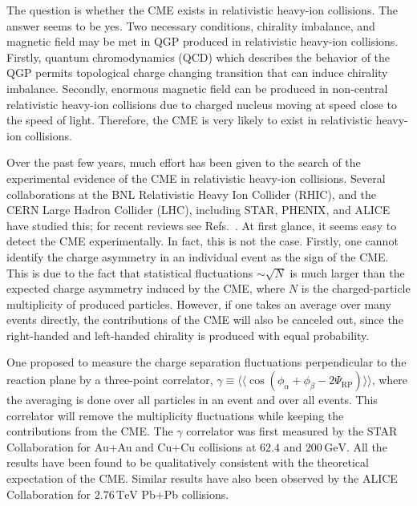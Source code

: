 \documentclass[preprint]{elsarticle}
\begin{document}
The question is whether the CME exists in relativistic heavy-ion collisions. The answer seems to be yes. Two necessary conditions, chirality imbalance, and magnetic field may be met in QGP produced in relativistic heavy-ion collisions. Firstly, quantum chromodynamics (QCD) which describes the behavior of the QGP permits topological charge changing transition that can induce chirality imbalance\cite{Kharzeev:2007jp}. Secondly, enormous magnetic field can be produced in non-central relativistic heavy-ion collisions due to charged nucleus moving at speed close to the speed of light\cite{Skokov:2009qp,Voronyuk:2011jd,Bzdak:2011yy,Deng:2012pc,Tuchin:2013apa,Mo:2013qya}. Therefore, the CME is very likely to exist in relativistic heavy-ion collisions.

Over the past few years, much effort has been given to the search of the experimental evidence of the CME in relativistic heavy-ion collisions. Several collaborations at the BNL Relativistic Heavy Ion Collider (RHIC), and the CERN Large Hadron Collider (LHC), including STAR\cite{Abelev2009ac, Abelev:2009ad, Voloshin:2008jx, PhysRevC.88.064911, Wang:2012qs, Adamczyk:2014mzf, Adamczyk:2013kcb}, PHENIX\cite{Ajitanand:2010}, and ALICE\cite{Christakoglou:2011uqg,PhysRevLett.110.012301} have studied this; for recent reviews see Refs.~\cite{Wang:2016mkm}.
At first glance, it seems easy to detect the CME experimentally. In fact, this is not the case. Firstly, one cannot identify the charge asymmetry in an individual event as the sign of the CME. This is due to the fact that statistical fluctuations $\sim \sqrt{N}$ is much larger than the expected charge asymmetry induced by the CME, where $N$ is the charged-particle multiplicity of produced particles\cite{Kharzeev:2007jp}. However, if one takes an average over many events directly, the contributions of the CME will also be canceled out, since the right-handed and left-handed chirality is produced with equal probability.

One proposed to measure the charge separation fluctuations perpendicular to the reaction plane by a three-point correlator, $\gamma \equiv \langle \langle \cos(\phi_\alpha + \phi_\beta - 2 \Psi_\text{RP}) \rangle \rangle$, where the averaging is done over all particles in an event and over all events\cite{Voloshin:2004vk,Kharzeev:2007jp}. This correlator will remove the multiplicity fluctuations while keeping the contributions from the CME. The $\gamma$ correlator was first measured by the STAR Collaboration for Au+Au and Cu+Cu collisions at $62.4$ and $200\,\mathrm{GeV}$\cite{Abelev2009ac,Abelev:2009ad}. All the results have been found to be qualitatively consistent with the theoretical expectation of the CME. Similar results have also been observed by the ALICE Collaboration for $2.76\,\mathrm{TeV}$ Pb+Pb collisions\cite{PhysRevLett.110.012301}.
\end{document}
